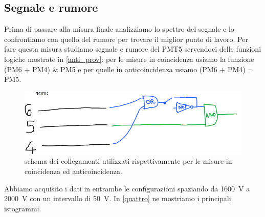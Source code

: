 
\subsection{Segnale e rumore}

Prima di passare alla misura finale analizziamo lo spettro del segnale e lo confrontiamo con quello del rumore per trovare il miglior punto di lavoro.
Per fare questa misura studiamo segnale e rumore del PMT5 servendoci delle funzioni logiche mostrate in \autoref{anti_prov}: per le misure in coincidenza usiamo la funzione (PM6 $+$ PM4) $\&$ PM5 e per quelle in anticoincidenza usiamo 
(PM6 $+$ PM4) $\neg$ PM5.

\begin{figure}[h]
\centering
\includegraphics[width=8 cm]{anti_prov}
\caption{schema dei collegamenti utilizzati rispettivamente per le misure in coincidenza ed anticoincidenza.}
\label{anti_prov}
\end{figure}

Abbiamo acquisito i dati in entrambe le configurazioni spaziando da \SI{1600}{V} a \SI{2000}{V} con un intervallo di \SI{50}{V}. In \autoref{quattro} ne mostriamo i principali istogrammi.

